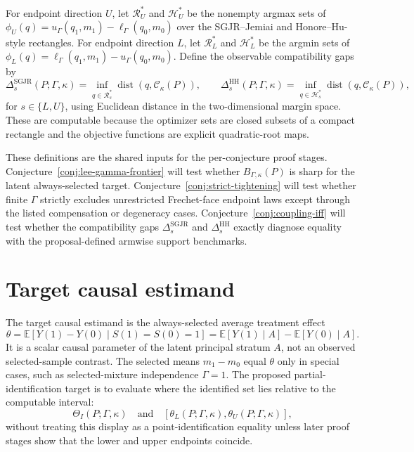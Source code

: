 \documentclass[11pt]{article}
\newcommand{\E}{\mathbb{E}}
\theoremstyle{definition}
\theoremstyle{plain}
\theoremstyle{remark}
\begin{document}
For endpoint direction \(U\), let \(\mathcal R_U^*\) and \(\mathcal H_U^*\) be
the nonempty argmax sets of \(\phi_U(q)=u_\Gamma(q_1,m_1)-\ell_\Gamma(q_0,m_0)\)
over the SGJR--Jemiai and Honore--Hu-style rectangles.  For endpoint direction
\(L\), let \(\mathcal R_L^*\) and \(\mathcal H_L^*\) be the argmin sets of
\(\phi_L(q)=\ell_\Gamma(q_1,m_1)-u_\Gamma(q_0,m_0)\).  Define the observable
compatibility gaps by
\[
  \Delta_s^{\mathrm{SGJR}}(P;\Gamma,\kappa)
  =
  \inf_{q\in\mathcal R_s^*}\operatorname{dist}(q,\mathcal C_\kappa(P)),
  \qquad
  \Delta_s^{\mathrm{HH}}(P;\Gamma,\kappa)
  =
  \inf_{q\in\mathcal H_s^*}\operatorname{dist}(q,\mathcal C_\kappa(P)),
\]
for \(s\in\{L,U\}\), using Euclidean distance in the two-dimensional margin
space.  These are computable because the optimizer sets are closed subsets of a
compact rectangle and the objective functions are explicit quadratic-root
maps.

These definitions are the shared inputs for the per-conjecture proof stages.
Conjecture~\ref{conj:lee-gamma-frontier} will test whether
\(B_{\Gamma,\kappa}(P)\) is sharp for the latent always-selected target.
Conjecture~\ref{conj:strict-tightening} will test whether finite \(\Gamma\)
strictly excludes unrestricted Frechet-face endpoint laws except through the
listed compensation or degeneracy cases.  Conjecture~\ref{conj:coupling-iff}
will test whether the compatibility gaps
\(\Delta_s^{\mathrm{SGJR}}\) and \(\Delta_s^{\mathrm{HH}}\) exactly diagnose
equality with the proposal-defined armwise support benchmarks.

\section{Target causal estimand}
The target causal estimand is the always-selected average treatment effect
\[
  \theta
  =
  \E[Y(1)-Y(0)\mid S(1)=S(0)=1]
  =
  \E[Y(1)\mid A]-\E[Y(0)\mid A].
\]
It is a scalar causal parameter of the latent principal stratum \(A\), not an
observed selected-sample contrast.  The selected means \(m_1-m_0\) equal
\(\theta\) only in special cases, such as selected-mixture independence
\(\Gamma=1\).  The proposed partial-identification target is to evaluate where
the identified set lies relative to the computable interval:
\[
  \Theta_I(P;\Gamma,\kappa)
  \quad\text{and}\quad
  [\theta_L(P;\Gamma,\kappa),\theta_U(P;\Gamma,\kappa)],
\]
without treating this display as a point-identification equality unless later
proof stages show that the lower and upper endpoints coincide.
\end{document}
